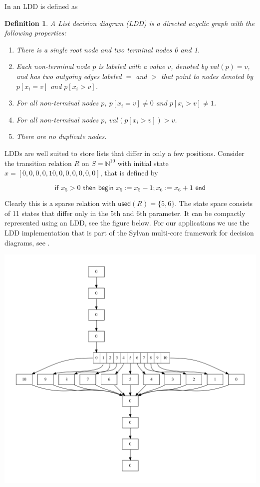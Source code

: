 \documentclass{article}
\newtheorem{definition}[theorem]{Definition}
\begin{document}
\noindent
In \cite{MeijerBlomPol2008} an LDD is defined as

\begin{definition}
A List decision diagram (LDD) is a
directed acyclic graph with the following properties:
\begin{enumerate}
    \item There is a single root node and two terminal nodes 0 and 1.
    \item Each non-terminal node $p$ is labeled with a value $v$, denoted by $val(p) = v$,
and has two outgoing edges labeled $=$ and $>$ that point to nodes denoted by
$p[x_i = v]$ and $p[x_i > v]$.
    \item For all non-terminal nodes $p$, $p[x_i = v] \neq 0$ and $p[x_i > v] \neq 1$.
    \item For all non-terminal nodes $p$, $val(p[x_i > v]) > v$.
    \item There are no duplicate nodes.
 \end{enumerate}
\end{definition}

\noindent
LDDs are well suited to store lists that differ in only a few positions.
Consider the transition relation $R$ on $S = \mathbb{N}^{10}$ with initial state
$x = [0, 0, 0, 0, 10, 0, 0, 0, 0, 0, 0]$, that is defined by

\[
\textsf{if } x_5 > 0 \textsf{ then begin } x_5 := x_5 - 1; x_6 := x_6 + 1 \textsf{ end}
\]

Clearly this is a sparse relation with $\textsf{used}(R) = \{ 5, 6 \}$. The state space
consists of 11 states that differ only in the 5th and 6th parameter. It can be compactly
represented using an LDD, see the figure below. For our applications we use the LDD implementation that is part of the Sylvan multi-core framework for decision diagrams, see
\cite{DBLP:journals/sttt/DijkP17}.

\includegraphics[width=15cm]{ldd_if_then.pdf}
\end{document}
